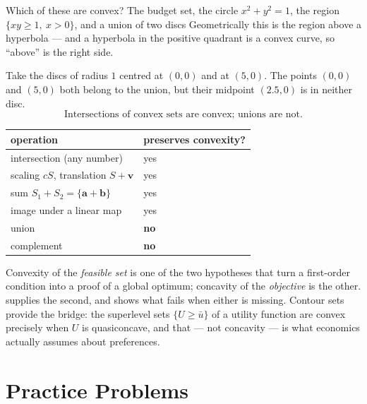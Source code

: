 \begin{worked}{Which of these are convex? The budget set, the circle $x^{2}+y^{2}=1$, the region $\{xy\ge1,\ x>0\}$, and a union of two discs}
Geometrically this is the region above a hyperbola --- and a hyperbola in
the positive quadrant is a convex curve, so ``above'' is the right side.

Take the discs of radius $1$ centred at $(0,0)$ and at $(5,0)$. The points
$(0,0)$ and $(5,0)$ both belong to the union, but their midpoint
$(2.5,0)$ is in neither disc.
\[
  \boxed{\text{Intersections of convex sets are convex; unions are not.}}
\]

\begin{center}\footnotesize
\begin{tabular}{ll}
  \hline
  operation & preserves convexity?\\
  \hline
  intersection (any number) & yes\\
  scaling $cS$, translation $S+\mathbf v$ & yes\\
  sum $S_{1}+S_{2}=\{\mathbf a+\mathbf b\}$ & yes\\
  image under a linear map & yes\\
  union & \textbf{no}\\
  complement & \textbf{no}\\
  \hline
\end{tabular}
\end{center}

Convexity of the \emph{feasible set} is one of the two hypotheses that turn
a first-order condition into a proof of a global optimum; concavity of the
\emph{objective} is the other.  supplies the second, and
 shows what fails when either is missing. Contour sets provide the
bridge: the superlevel sets $\{U\ge\bar u\}$ of a utility function are
convex precisely when $U$ is quasiconcave, and that --- not concavity --- is
what economics actually assumes about preferences.
\end{worked}

\section{Practice Problems}

